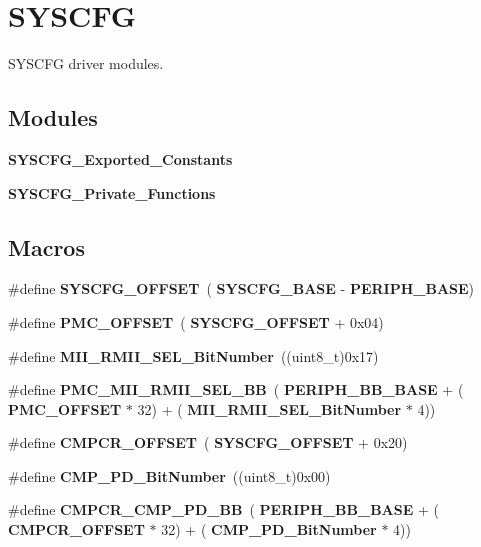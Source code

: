 \section{S\+Y\+S\+C\+FG}
\label{group__SYSCFG}


S\+Y\+S\+C\+FG driver modules.  


\subsection*{Modules}
\begin{DoxyCompactItemize}
\item 
\textbf{ S\+Y\+S\+C\+F\+G\+\_\+\+Exported\+\_\+\+Constants}
\item 
\textbf{ S\+Y\+S\+C\+F\+G\+\_\+\+Private\+\_\+\+Functions}
\end{DoxyCompactItemize}
\subsection*{Macros}
\begin{DoxyCompactItemize}
\item 
\#define \textbf{ S\+Y\+S\+C\+F\+G\+\_\+\+O\+F\+F\+S\+ET}~(\textbf{ S\+Y\+S\+C\+F\+G\+\_\+\+B\+A\+SE} -\/ \textbf{ P\+E\+R\+I\+P\+H\+\_\+\+B\+A\+SE})
\item 
\#define \textbf{ P\+M\+C\+\_\+\+O\+F\+F\+S\+ET}~(\textbf{ S\+Y\+S\+C\+F\+G\+\_\+\+O\+F\+F\+S\+ET} + 0x04)
\item 
\#define \textbf{ M\+I\+I\+\_\+\+R\+M\+I\+I\+\_\+\+S\+E\+L\+\_\+\+Bit\+Number}~((uint8\+\_\+t)0x17)
\item 
\#define \textbf{ P\+M\+C\+\_\+\+M\+I\+I\+\_\+\+R\+M\+I\+I\+\_\+\+S\+E\+L\+\_\+\+BB}~(\textbf{ P\+E\+R\+I\+P\+H\+\_\+\+B\+B\+\_\+\+B\+A\+SE} + (\textbf{ P\+M\+C\+\_\+\+O\+F\+F\+S\+ET} $\ast$ 32) + (\textbf{ M\+I\+I\+\_\+\+R\+M\+I\+I\+\_\+\+S\+E\+L\+\_\+\+Bit\+Number} $\ast$ 4))
\item 
\#define \textbf{ C\+M\+P\+C\+R\+\_\+\+O\+F\+F\+S\+ET}~(\textbf{ S\+Y\+S\+C\+F\+G\+\_\+\+O\+F\+F\+S\+ET} + 0x20)
\item 
\#define \textbf{ C\+M\+P\+\_\+\+P\+D\+\_\+\+Bit\+Number}~((uint8\+\_\+t)0x00)
\item 
\#define \textbf{ C\+M\+P\+C\+R\+\_\+\+C\+M\+P\+\_\+\+P\+D\+\_\+\+BB}~(\textbf{ P\+E\+R\+I\+P\+H\+\_\+\+B\+B\+\_\+\+B\+A\+SE} + (\textbf{ C\+M\+P\+C\+R\+\_\+\+O\+F\+F\+S\+ET} $\ast$ 32) + (\textbf{ C\+M\+P\+\_\+\+P\+D\+\_\+\+Bit\+Number} $\ast$ 4))
\end{DoxyCompactItemize}
